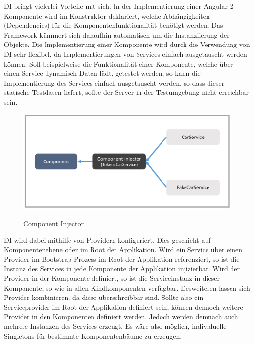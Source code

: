 \ac{DI} bringt vielerlei Vorteile mit sich. In der Implementierung einer Angular 2 Komponente wird im
Konstruktor deklariert, welche Abhängigkeiten (Dependencies) für die Komponentenfunktionalität benötigt werden.
Das Framework kümmert sich daraufhin automatisch um die Instanziierung der Objekte.
Die Implementierung einer Komponente wird durch die Verwendung von \ac{DI} sehr flexibel,
da Implementierungen von Services einfach ausgetauscht werden können.
Soll beispielweise die Funktionalität einer Komponente, welche über einen Service dynamisch Daten lädt, getestet werden,
so kann die Implementierung des Services einfach ausgetauscht werden, so dass dieser statische Testdaten liefert,
sollte der Server in der Testumgebung nicht erreichbar sein.
\cite[281]{Angular2}


\vspace{0.3cm}

\begin{figure}[ht]
 \centering
 \includegraphics[width=0.8\linewidth]{kapitel3/component-injector.png}
 \caption{Component Injector}\cite[343]{Angular2}
\end{figure}
\vspace{0.3cm}

\ac{DI} wird dabei mithilfe von Providern konfiguriert.
Dies geschieht auf Komponentenebene oder im Root der Applikation.
Wird ein Service über einen Provider im Bootstrap Prozess im Root der Applikation referenziert,
so ist die Instanz des Services in jede Komponente der Applikation injizierbar.
Wird der Provider in der Komponente definiert, so ist die Serviceinstanz in dieser Komponente, so wie in
allen Kindkomponenten verfügbar. Desweiteren lassen sich Provider kombinieren, da diese überschreibbar sind.
Sollte also ein Serviceprovider im Root der Applikation definiert sein, können dennoch weitere Provider in den Komponenten definiert werden.
Jedoch werden demnach auch mehrere Instanzen des Services erzeugt.
Es wäre also möglich, individuelle Singletons für bestimmte Komponentenbäume zu erzeugen. \cite[286]{Angular2}

